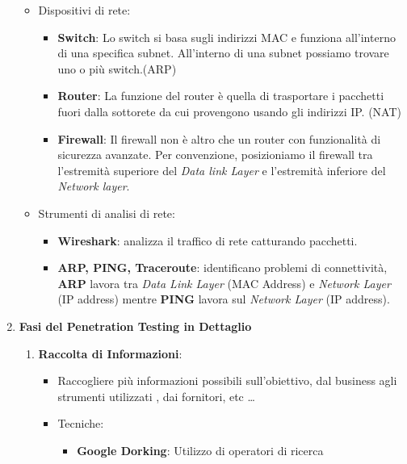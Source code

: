\documentclass[12pt]{article}
\begin{document}
\begin{enumerate}
\begin{itemize}
\begin{itemize}
        \end{itemize}
        \item Dispositivi di rete:
        \begin{itemize}
            \item \textbf{Switch}: Lo switch si basa sugli indirizzi MAC e 
            funziona all'interno di una specifica subnet. All'interno di una 
            subnet possiamo trovare uno o pi\`{u} switch.(ARP)
            \item \textbf{Router}: La funzione del router \`{e} quella di
            trasportare i pacchetti fuori dalla sottorete da cui provengono usando 
            gli indirizzi IP. (NAT)
            \item \textbf{Firewall}: Il firewall non \`{e} altro che un
            router con funzionalit\`{a} di sicurezza avanzate. Per convenzione,
            posizioniamo il firewall tra l'estremit\`{a} superiore del 
            \textit{Data link Layer} e l'estremit\`{a} inferiore del 
            \textit{Network layer}.
        \end{itemize}
        \item Strumenti di analisi di rete:
        \begin{itemize}
            \item \textbf{Wireshark}: analizza il traffico di rete catturando 
            pacchetti.
            \item \textbf{ARP, PING, Traceroute}: identificano problemi di 
            connettivit\`{a}, \textbf{ARP} lavora tra \textit{Data Link Layer} 
            (MAC Address) e \textit{Network Layer} (IP address) mentre 
            \textbf{PING} lavora sul \textit{Network Layer} (IP address).
        \end{itemize}
    \end{itemize}
    \item \textbf{Fasi del Penetration Testing in Dettaglio}
    \begin{enumerate}
        \item \textbf{Raccolta di Informazioni}:
        \begin{itemize}
            \item Raccogliere pi\`{u} informazioni possibili sull'obiettivo, 
            dal business agli strumenti utilizzati , dai fornitori, etc \dots
            \item Tecniche:
            \begin{itemize}
                \item \textbf{Google Dorking}: Utilizzo di operatori di ricerca 

\end{itemize}
\end{itemize}
\end{enumerate}
\end{enumerate}
\end{document}
